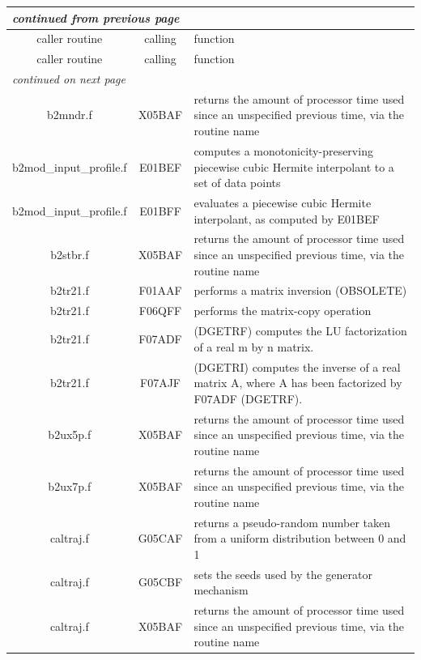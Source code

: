 \documentclass[a4paper,10pt]{report}
\begin{document}
\begin{center}
  \begin{longtable}[hbtp]{|c|c|p{10cm}|}
    \hline
    \multicolumn{3}{|l|}{\small\sl continued from previous page} \\
    \hline caller routine & calling & function \\
    \hline \endhead
    \hline caller routine & calling & function \\
    \hline \endfirsthead
    \hline
    \multicolumn{2}{|l|}{\small\sl continued on next page} \\
    \hline \endfoot
    \endlastfoot
b2mndr.f                &  X05BAF & returns the amount of processor time used since an unspecified previous time, via the routine name \\ \hline
b2mod\_input\_profile.f &  E01BEF & computes a monotonicity-preserving piecewise cubic Hermite interpolant to a set of data points \\ \hline
b2mod\_input\_profile.f &  E01BFF & evaluates a piecewise cubic Hermite interpolant, as computed by E01BEF \\ \hline
b2stbr.f                &  X05BAF & returns the amount of processor time used since an unspecified previous time, via the routine name \\ \hline
b2tr21.f                &  F01AAF & performs a matrix inversion (OBSOLETE) \\ \hline
b2tr21.f                &  F06QFF & performs the matrix-copy operation \\ \hline
b2tr21.f                &  F07ADF & (DGETRF) computes the LU factorization of a real m by n matrix. \\ \hline
b2tr21.f                &  F07AJF & (DGETRI) computes the inverse of a real matrix A, where A has been factorized by F07ADF (DGETRF). \\ \hline
b2ux5p.f                &  X05BAF & returns the amount of processor time used since an unspecified previous time, via the routine name \\ \hline
b2ux7p.f                &  X05BAF & returns the amount of processor time used since an unspecified previous time, via the routine name \\ \hline
caltraj.f               &  G05CAF & returns a pseudo-random number taken from a uniform distribution between 0 and 1 \\ \hline
caltraj.f               &  G05CBF & sets the seeds used by the generator mechanism \\ \hline
caltraj.f               &  X05BAF & returns the amount of processor time used since an unspecified previous time, via the routine name \\ \hline

\end{longtable}
\end{center}
\end{document}
